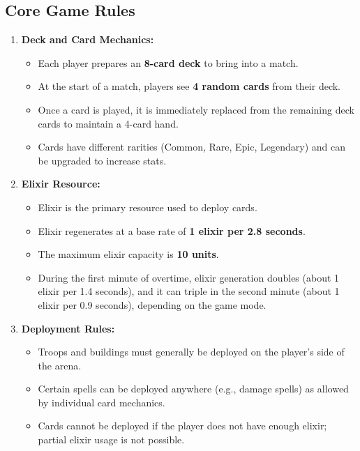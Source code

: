 \documentclass{article}
\begin{document}
\subsection{Core Game Rules}
\begin{enumerate}[label=\arabic*.]
    \item \textbf{Deck and Card Mechanics:}
    \begin{itemize}
        \item Each player prepares an \textbf{8-card deck} to bring into a match.
        \item At the start of a match, players see \textbf{4 random cards} from their deck.
        \item Once a card is played, it is immediately replaced from the remaining deck cards to maintain a 4-card hand.
        \item Cards have different rarities (Common, Rare, Epic, Legendary) and can be upgraded to increase stats.
    \end{itemize}

    \item \textbf{Elixir Resource:}
    \begin{itemize}
        \item Elixir is the primary resource used to deploy cards. 
        \item Elixir regenerates at a base rate of \textbf{1 elixir per 2.8 seconds}.
        \item The maximum elixir capacity is \textbf{10 units}.
        \item During the first minute of overtime, elixir generation doubles (about 1 elixir per 1.4 seconds), and it can triple in the second minute (about 1 elixir per 0.9 seconds), depending on the game mode.
    \end{itemize}

    \item \textbf{Deployment Rules:}
    \begin{itemize}
        \item Troops and buildings must generally be deployed on the player's side of the arena.
        \item Certain spells can be deployed anywhere (e.g., damage spells) as allowed by individual card mechanics.
        \item Cards cannot be deployed if the player does not have enough elixir; partial elixir usage is not possible.
    \end{itemize}


\end{enumerate}
\end{document}
